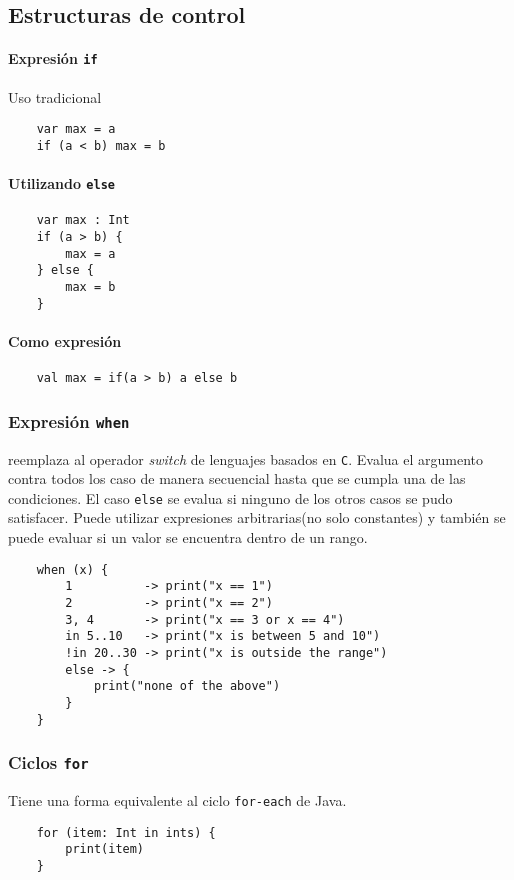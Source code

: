 \subsection{Estructuras de control}

\paragraph{Expresión \texttt{if}}
Uso tradicional
\begin{verbatim}
    var max = a
    if (a < b) max = b
\end{verbatim}

\paragraph{Utilizando \texttt{else}}
\begin{verbatim}
    var max : Int
    if (a > b) {
        max = a
    } else {
        max = b
    }
\end{verbatim}

\paragraph{Como expresión}
\begin{verbatim}
    val max = if(a > b) a else b
\end{verbatim}




\subsubsection{Expresión \texttt{when}}
reemplaza al operador \emph{switch} de lenguajes basados en \texttt{C}. Evalua el argumento contra todos los caso de manera secuencial hasta que se cumpla una de las condiciones. El caso \texttt{else} se evalua si ninguno de los otros casos se pudo satisfacer. Puede utilizar expresiones arbitrarias(no solo constantes) y también se puede evaluar si un valor se encuentra dentro de un rango.
\begin{verbatim}
    when (x) {
        1          -> print("x == 1")
        2          -> print("x == 2")
        3, 4       -> print("x == 3 or x == 4")
        in 5..10   -> print("x is between 5 and 10")
        !in 20..30 -> print("x is outside the range")
        else -> {
            print("none of the above")
        }
    }
\end{verbatim}

\subsubsection{Ciclos \texttt{for}} 
Tiene una forma equivalente al ciclo \texttt{for-each} de Java.
\begin{verbatim}
    for (item: Int in ints) {
        print(item)
    }
\end{verbatim}

